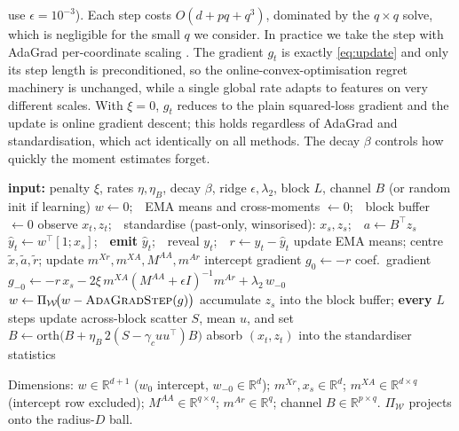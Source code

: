 \documentclass[12pt]{article}
\theoremstyle{plain}
\theoremstyle{remark}
\newcommand{\R}{\mathbb{R}}
\newcommand{\OARF}{\textsc{OARF}}
\begin{document}
use $\epsilon=10^{-3}$). Each step costs $O(d+pq+q^3)$, dominated by the $q\times q$
solve, which is negligible for the small $q$ we consider. In practice we take the step
with AdaGrad per-coordinate scaling \citep{duchi2011adagrad}. The gradient $g_t$ is
exactly \eqref{eq:update} and only its step length is preconditioned, so the
online-convex-optimisation regret machinery is unchanged, while a single global rate
adapts to features on very different scales. With $\xi=0$, $g_t$ reduces to the plain
squared-loss gradient and the update is online gradient descent; this holds
regardless of AdaGrad and standardisation, which act identically on all methods. The
decay $\beta$ controls how quickly the moment estimates forget.

\begin{algorithm}[t]
\caption{\OARF{}, one streaming pass. The block for learning the channel is the
extension of Section~\ref{sec:learned} and is skipped when the channel is supplied.}
\label{alg:oarf}
\begin{algorithmic}[1]
\State \textbf{input:} penalty $\xi$, rates $\eta,\eta_B$, decay $\beta$, ridge
$\epsilon,\lambda_2$, block $L$, channel $B$ (or random init if learning)
\State $w\gets 0$;\ \ EMA means and cross-moments $\gets 0$;\ \ block buffer $\gets 0$
  \State observe $x_t,z_t$;\ \ standardise (past-only, winsorised): $x_s,z_s$;\ \ $a\gets B^\top z_s$
  \State $\hat y_t\gets w^\top[1;x_s]$;\ \ \textbf{emit} $\hat y_t$;\ \ reveal $y_t$;\ \ $r\gets y_t-\hat y_t$
  \State update EMA means; centre $\tilde x,\tilde a,\tilde r$; update $m^{Xr},m^{XA},M^{AA},m^{Ar}$
  \State intercept gradient $g_0\gets -r$
  \State coef.\ gradient $g_{-0}\gets -r\,x_s-2\xi\,m^{XA}(M^{AA}+\epsilon I)^{-1}m^{Ar}+\lambda_2\,w_{-0}$
  \State $w\gets \Pi_{\mathcal{W}}\!\big(w-\textsc{AdaGradStep}(g)\big)$ 
     \State accumulate $z_s$ into the block buffer; \textbf{every} $L$ steps update
     across-block scatter $S$, mean $u$, and set $B\gets \mathrm{orth}\big(B+\eta_B\,2(S-\gamma_c uu^\top)B\big)$
  \EndIf
  \State absorb $(x_t,z_t)$ into the standardiser statistics
\EndFor
\end{algorithmic}
{\footnotesize Dimensions: $w\in\R^{d+1}$ ($w_0$ intercept, $w_{-0}\in\R^d$);
$m^{Xr},x_s\in\R^{d}$; $m^{XA}\in\R^{d\times q}$ (intercept row excluded);
$M^{AA}\in\R^{q\times q}$; $m^{Ar}\in\R^{q}$; channel $B\in\R^{p\times q}$.
$\Pi_{\mathcal{W}}$ projects onto the radius-$D$ ball.}
\end{algorithm}
\end{document}
